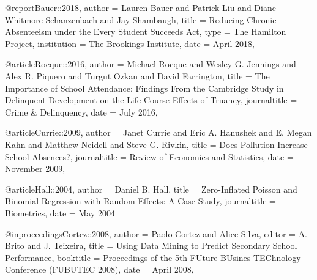 @report{Bauer::2018,
	author = {Lauren Bauer and Patrick Liu and Diane Whitmore Schanzenbach and Jay Shambaugh},
	title = {Reducing Chronic Absenteeism under the Every Student Succeeds Act},
	type = {The Hamilton Project},
	institution = {The Brookings Institute},
	date = {April 2018},
}

@article{Rocque::2016,
	author = {Michael Rocque and Wesley G. Jennings and Alex R. Piquero and Turgut Ozkan and David Farrington},
	title = {The Importance of School Attendance: Findings From the Cambridge Study in Delinquent Development on the Life-Course Effects of Truancy},
	journaltitle = {Crime & Delinquency},
	date = {July 2016},
}

@article{Currie::2009,
	author = {Janet Currie and Eric A. Hanushek and E. Megan Kahn and Matthew Neidell and Steve G. Rivkin},
	title = {Does Pollution Increase School Absences?},
	journaltitle = {Review of Economics and Statistics},
	date = {November 2009},
}

@article{Hall::2004,
	author = {Daniel B. Hall},
	title = {Zero-Inflated Poisson and Binomial Regression with Random Effects: A Case Study},
	journaltitle = {Biometrics},
	date = {May 2004}}

@inproceedings{Cortez::2008,
	author = {Paolo Cortez and Alice Silva},
	editor = {A. Brito and J. Teixeira},
	title = {Using Data Mining to Predict Secondary School Performance},
	booktitle = {Proceedings of the 5th FUture BUsines TEChnology Conference (FUBUTEC 2008)},
	date = {April 2008},
}

